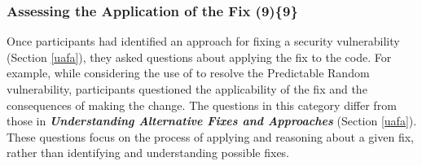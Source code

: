 \documentclass[10pt,journal,compsoc]{IEEEtran}
\begin{document}








\subsubsection{Assessing the Application of the Fix (9)\{9\}}\label{aaf}

Once participants had identified an approach for fixing a security vulnerability (Section \ref{uafa}), they asked questions about applying the fix to the code.
For example, while considering the use of  to resolve the Predictable Random vulnerability, participants questioned the applicability of the fix and the consequences of making the change. 
The questions in this category differ from those in \emph{\textbf{Understanding Alternative Fixes and Approaches}} (Section \ref{uafa}). 
These questions focus on the process of applying  and reasoning about a given fix, rather than identifying and understanding possible fixes.
\\
\end{document}
